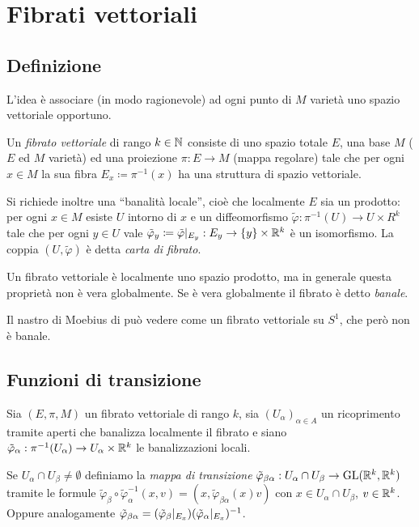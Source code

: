 \chapter{Fibrati vettoriali}

\section{Definizione}

L'idea è associare (in modo ragionevole) ad ogni punto di $M$ varietà uno spazio vettoriale opportuno.

\begin{definition} 
	Un \emph{fibrato vettoriale} di rango $k\in\mathbb N$ consiste di uno spazio totale $E$, una base $M$ ($E$ ed $M$ varietà) ed una proiezione $\pi:E\to M$ (mappa regolare) tale che per ogni $x\in M$ la sua fibra $E_x\coloneqq \pi^{-1}(x)$ ha una struttura di spazio vettoriale.
	
	Si richiede inoltre una ``banalità locale'', cioè che localmente $E$ sia un prodotto: per ogni $x\in M$ esiste $U$ intorno di $x$ e un diffeomorfismo $\tilde\varphi:\pi^{-1}(U)\to U\times R^k$ tale che per ogni $y\in U$ vale $\tilde\varphi_y\coloneqq \tilde\varphi|_{E_y}:E_y\to \{y\}\times \mathbb R^k$ è un isomorfismo.
	La coppia $(U,\tilde\varphi)$ è detta \emph{carta di fibrato}.
\end{definition}

\begin{remark}
	Un fibrato vettoriale è localmente uno spazio prodotto, ma in generale questa proprietà non è vera globalmente. Se è vera globalmente il fibrato è detto \emph{banale}.
\end{remark}

\begin{example} 
	Il nastro di Moebius di può vedere come un fibrato vettoriale su $S^1$, che però non è banale.
\end{example}

\section{Funzioni di transizione}

Sia $(E,\pi, M)$ un fibrato vettoriale di rango $k$, sia $(U_\alpha)_{\alpha\in A}$ un ricoprimento tramite aperti che banalizza localmente il fibrato e siano $\tilde\varphi_\alpha:\pi^{-1}(U_\alpha)\to U_\alpha\times \mathbb R^k$ le banalizzazioni locali.

\begin{definition} 
	Se $U_\alpha\cap U_\beta\ne \emptyset$ definiamo la \emph{mappa di transizione} $\tilde\varphi_{\beta\alpha}:U_\alpha \cap U_\beta \to \mathrm{GL}(\mathbb R^k,\mathbb R^k)$ tramite le formule $\tilde\varphi_\beta \circ \tilde\varphi_\alpha^{-1} (x,v) = (x, \tilde\varphi_{\beta\alpha}(x)v)$ con $x\in U_\alpha \cap U_\beta$, $v\in\mathbb R^k$. Oppure analogamente $\tilde\varphi_{\beta\alpha} = (\tilde\varphi_\beta|_{E_x})(\tilde\varphi_\alpha|_{E_x})^{-1}$.
\end{definition}
	
